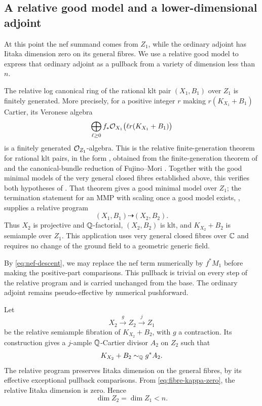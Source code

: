 \subsection{A relative good model and a lower-dimensional adjoint}

At this point the nef summand comes from $Z_1$, while the ordinary
adjoint has Iitaka dimension zero on its general fibres.  We use a
relative good model to express that ordinary adjoint as a pullback
from a variety of dimension less than $n$.

The relative log canonical ring of the rational klt pair
$(X_1,B_1)$ over $Z_1$ is finitely generated.  More precisely, for
a positive integer $r$ making $r(K_{X_1}+B_1)$ Cartier, its Veronese
algebra
\[
 \bigoplus_{\ell\geq0}
 f_*\mathcal O_{X_1}\bigl(\ell r(K_{X_1}+B_1)\bigr)
\]
is a finitely generated $\mathcal O_{Z_1}$-algebra.  This is the relative
finite-generation theorem for rational klt pairs, in the form
\cite[Theorem 1.4]{FujinoFG}, obtained from the finite-generation theorem
of \cite{BCHM} and the canonical-bundle reduction of
Fujino--Mori \cite[Theorem~5.2]{FM}.
Together with the good minimal models of the very general closed
fibres established above, this verifies both hypotheses of
\cite[Theorem 2.12]{HX}.  That theorem gives a good minimal model
over $Z_1$; the termination statement for an MMP with scaling once
a good model exists, \cite[Corollary 2.9]{HX}, supplies a relative
program
\[
                       (X_1,B_1)\dashrightarrow(X_2,B_2).
\]
Thus $X_2$ is projective and $\mathbb Q$-factorial, $(X_2,B_2)$ is klt,
and $K_{X_2}+B_2$ is semiample over $Z_1$.  This application uses
very general closed fibres over $\mathbb C$ and requires no change of the
ground field to a geometric generic field.

By \eqref{eq:nef-descent}, we may replace the nef term numerically
by $f^*M_1$ before making the positive-part comparisons.  This
pullback is trivial on every step of the relative program and is
carried unchanged from the base.  The ordinary adjoint remains
pseudo-effective by numerical pushforward.

Let
\[
                    X_2\xrightarrow{g}Z_2\xrightarrow{j}Z_1
\]
be the relative semiample fibration of $K_{X_2}+B_2$, with $g$ a
contraction.  Its construction gives a $j$-ample $\mathbb Q$-Cartier
divisor $A_2$ on $Z_2$ such that
\begin{equation}\label{eq:relative-iitaka}
                         K_{X_2}+B_2\sim_\mathbb Q g^*A_2.
\end{equation}
The relative program preserves Iitaka dimension on the general
fibres, by its effective exceptional pullback comparisons.  From
\eqref{eq:fibre-kappa-zero}, the relative Iitaka dimension is zero.
Hence
\[
                           \dim Z_2=\dim Z_1<n.
\]

